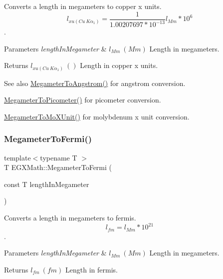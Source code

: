 Converts a length in megameters to copper x units. \[ l_{xu(Cu\ K\alpha_1)}= \frac{1}{1.00207697*10^{-13}} l_{Mm} * 10^{6}\]. 


\begin{DoxyParams}{Parameters}
{\em length\+In\+Megameter} & $ l_{Mm}\ (Mm)$ Length in megameters. \\
\hline
\end{DoxyParams}
\begin{DoxyReturn}{Returns}
$ l_{xu(Cu\ K\alpha_1)}\ ()$ Length in copper x units. 
\end{DoxyReturn}
\begin{DoxySeeAlso}{See also}
\mbox{\hyperlink{group___e_g_x_math-_conversions-_length_conversions-_s_i-_megameter-_non-_s_i_gac4c7e615f4ec3d000ac341a5bf9a79a0}{Megameter\+To\+Angstrom()}} for angstrom conversion. 

\mbox{\hyperlink{group___e_g_x_math-_conversions-_length_conversions-_s_i-_megameter-_s_i_ga0f6585bdcd16b6748b6c4d9116dd955c}{Megameter\+To\+Picometer()}} for picometer conversion. 

\mbox{\hyperlink{group___e_g_x_math-_conversions-_length_conversions-_s_i-_megameter-_non-_s_i_ga134a9fb2603b93c739c4ee58864f69c6}{Megameter\+To\+Mo\+X\+Unit()}} for molybdenum x unit conversion. 
\end{DoxySeeAlso}
\mbox{\label{group___e_g_x_math-_conversions-_length_conversions-_s_i-_megameter-_non-_s_i_ga74f07a7c24ffe784415fb3d33a3b5bec}} 
\subsubsection{\texorpdfstring{Megameter\+To\+Fermi()}{MegameterToFermi()}}
{\footnotesize\ttfamily template$<$typename T $>$ \\
T E\+G\+X\+Math\+::\+Megameter\+To\+Fermi (\begin{DoxyParamCaption}\item[{const T}]{length\+In\+Megameter }\end{DoxyParamCaption})}



Converts a length in megameters to fermis. \[ l_{fm}=l_{Mm} * 10^{21} \]. 


\begin{DoxyParams}{Parameters}
{\em length\+In\+Megameter} & $ l_{Mm}\ (Mm)$ Length in megameters. \\
\hline
\end{DoxyParams}
\begin{DoxyReturn}{Returns}
$ l_{fm}\ (fm)$ Length in fermis. 
\end{DoxyReturn}
\mbox{\label{group___e_g_x_math-_conversions-_length_conversions-_s_i-_megameter-_non-_s_i_ga14e6b356b28257b1bde9cb9ebf6bc3c6}} 
